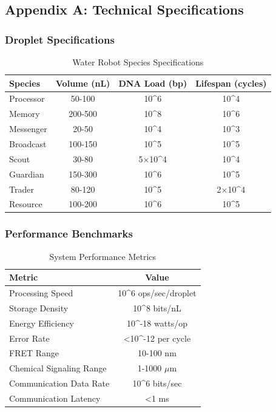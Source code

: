 \documentclass[11pt,a4paper]{article}
\begin{document}
\subsection{Appendix A: Technical Specifications}

\subsubsection{Droplet Specifications}
\begin{table}[H]
\centering
\begin{tabular}{|l|c|c|c|}
\hline
\textbf{Species} & \textbf{Volume (nL)} & \textbf{DNA Load (bp)} & \textbf{Lifespan (cycles)} \\
\hline
Processor & 50-100 & 10\^{}6 & 10\^{}4 \\
Memory & 200-500 & 10\^{}8 & 10\^{}6 \\
Messenger & 20-50 & 10\^{}4 & 10\^{}3 \\
Broadcast & 100-150 & 10\^{}5 & 10\^{}5 \\
Scout & 30-80 & 5×10\^{}4 & 10\^{}4 \\
Guardian & 150-300 & 10\^{}6 & 10\^{}5 \\
Trader & 80-120 & 10\^{}5 & 2×10\^{}4 \\
Resource & 100-200 & 10\^{}6 & 10\^{}5 \\
\hline
\end{tabular}
\caption{Water Robot Species Specifications}
\end{table}

\subsubsection{Performance Benchmarks}
\begin{table}[H]
\centering
\begin{tabular}{|l|c|}
\hline
\textbf{Metric} & \textbf{Value} \\
\hline
Processing Speed & 10\^{}6 ops/sec/droplet \\
Storage Density & 10\^{}8 bits/nL \\
Energy Efficiency & 10\^{}-18 watts/op \\
Error Rate & <10\^{}-12 per cycle \\
FRET Range & 10-100 nm \\
Chemical Signaling Range & 1-1000 $\mu$m \\
Communication Data Rate & 10\^{}6 bits/sec \\
Communication Latency & <1 ms \\
\hline
\end{tabular}
\caption{System Performance Metrics}
\end{table}
\end{document}

